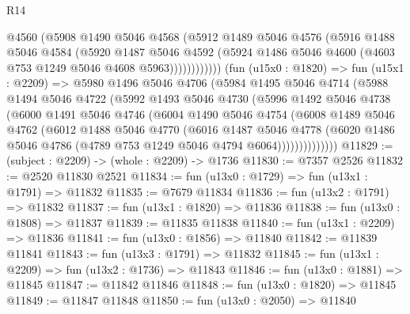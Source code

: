 \begin{lexlean}{R14}
\begin{coremodule}
                    @4560
                    (@5908
                      @1490
                      @5046
                      @4568
                      (@5912
                        @1489
                        @5046
                        @4576
                        (@5916
                          @1488
                          @5046
                          @4584
                          (@5920
                            @1487
                            @5046
                            @4592
                            (@5924 @1486 @5046 @4600 (@4603 @753 @1249 @5046 @4608 @5963))))))))))))
        (fun (u15x0 : @1820) =>
        fun (u15x1 : @2209) =>
        @5980
          @1496
          @5046
          @4706
          (@5984
            @1495
            @5046
            @4714
            (@5988
              @1494
              @5046
              @4722
              (@5992
                @1493
                @5046
                @4730
                (@5996
                  @1492
                  @5046
                  @4738
                  (@6000
                    @1491
                    @5046
                    @4746
                    (@6004
                      @1490
                      @5046
                      @4754
                      (@6008
                        @1489
                        @5046
                        @4762
                        (@6012
                          @1488
                          @5046
                          @4770
                          (@6016
                            @1487
                            @5046
                            @4778
                            (@6020
                              @1486
                              @5046
                              @4786
                              (@4789 @753 @1249 @5046 @4794 @6064))))))))))))))
@11829 := (subject : @2209) -> (whole : @2209) -> @1736
@11830 := @7357 @2526
@11832 := @2520 @11830 @2521
@11834 := fun (u13x0 : @1729) => fun (u13x1 : @1791) => @11832
@11835 := @7679 @11834
@11836 := fun (u13x2 : @1791) => @11832
@11837 := fun (u13x1 : @1820) => @11836
@11838 := fun (u13x0 : @1808) => @11837
@11839 := @11835 @11838
@11840 := fun (u13x1 : @2209) => @11836
@11841 := fun (u13x0 : @1856) => @11840
@11842 := @11839 @11841
@11843 := fun (u13x3 : @1791) => @11832
@11845 := fun (u13x1 : @2209) => fun (u13x2 : @1736) => @11843
@11846 := fun (u13x0 : @1881) => @11845
@11847 := @11842 @11846
@11848 := fun (u13x0 : @1820) => @11845
@11849 := @11847 @11848
@11850 := fun (u13x0 : @2050) => @11840

\end{coremodule}
\end{lexlean}
